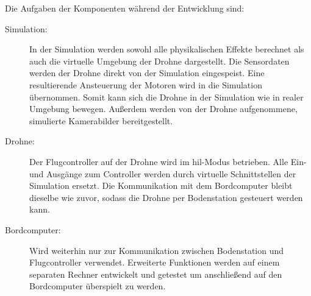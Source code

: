Die Aufgaben der Komponenten während der Entwicklung sind:
\begin{description}
    \item[Simulation:] In der Simulation werden sowohl alle physikalischen Effekte berechnet als auch die virtuelle Umgebung der Drohne dargestellt. Die Sensordaten werden der Drohne direkt von der Simulation eingespeist. Eine resultierende Ansteuerung der Motoren wird in die Simulation übernommen. Somit kann sich die Drohne in der Simulation wie in realer Umgebung bewegen. Außerdem werden von der Drohne aufgenommene, simulierte Kamerabilder bereitgestellt.
    \item[Drohne:] Der Flugcontroller auf der Drohne wird im \gls{hil}-Modus betrieben. Alle Ein- und Ausgänge zum Controller werden durch virtuelle Schnittstellen der Simulation ersetzt. Die Kommunikation mit dem Bordcomputer bleibt dieselbe wie zuvor, sodass die Drohne per Bodenstation gesteuert werden kann.
    \item[Bordcomputer:] Wird weiterhin nur zur Kommunikation zwischen Bodenstation und Flugcontroller verwendet. Erweiterte Funktionen werden auf einem separaten Rechner entwickelt und getestet um anschließend auf den Bordcomputer überspielt zu werden.
\end{description}

%
%